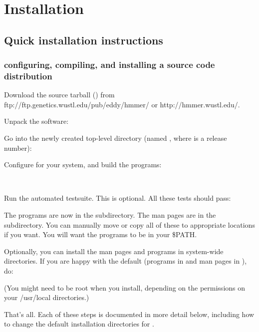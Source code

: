 \section{Installation}
\label{section:installation}

\subsection{Quick installation instructions}

\subsubsection{configuring, compiling, and installing a source code distribution}

Download the source tarball () from 
                  {ftp://ftp.genetics.wustl.edu/pub/eddy/hmmer/}
or 
                  {http://hmmer.wustl.edu/}.

Unpack the software:


Go into the newly created top-level directory (named ,
where  is a release number):


Configure for your system, and build the programs:

\\

Run the automated testsuite. This is optional.  All these tests should
pass:


The programs are now in the  subdirectory. The man pages
are in the  subdirectory. You can manually
move or copy all of these to appropriate locations if you want. You
will want the programs to be in your \$PATH.

Optionally, you can install the man pages and programs in system-wide
directories. If you are happy with the default (programs in
 and man pages in ),
do:


(You might need to be root when you install, depending on the
permissions on your /usr/local directories.)

That's all.  Each of these steps is documented in more detail below,
including how to change the default installation directories for
.

